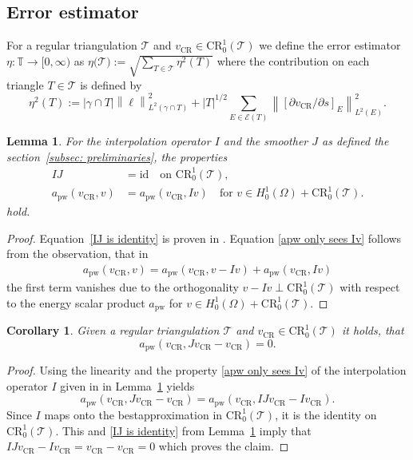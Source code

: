 \documentclass[11pt,a4paper]{article}
\newcommand{\vCR}{v_{\mathrm{CR}}}
\newcommand{\norm}[1]{\left \lVert #1 \right \rVert}
\newcommand{\apw}[2]{a_{\mathrm{pw}}\!\left(#1,#2\right)}
\newcommand{\CR}{\mathrm{CR}^1_0(\mathcal{T})}
\newtheorem{lemma}{Lemma}
\newtheorem{corollary}{Corollary}
\begin{document}
\subsection{Error estimator}
For a regular triangulation \(\mathcal{T}\) and  \(\vCR \in \CR\) we define the error estimator \(\eta: \mathbb{T} \rightarrow [0,\infty)\) as \(\eta(\mathcal{T)} := \sqrt{\sum_{T \in \mathcal{T}} \eta^2(T)}\) where the contribution on each triangle \(T \in \mathcal{T}\) is defined by
\begin{equation} \label{definition estimator}
\eta^2(T) := |\gamma \cap T| \norm{\ell}^2_{L^2(\gamma \cap T)} + |T|^{1/2} \sum_{E \in \mathcal{E}(T)} \norm{[\partial \vCR/\partial s]_E}^2_{L^2(E)}.
\end{equation}
\begin{lemma}
\label{lemma: properties of I and J}
For the interpolation operator \(I\) and the smoother \(J\) as defined the section~\ref{subsec: preliminaries}, the properties
\begin{align}
IJ &= \mathrm{id} \quad \text{on } \mathrm{CR}^1_0(\mathcal{T}), \label{IJ is identity}\\
\apw{\vCR}{v} &= \apw{\vCR}{Iv} \quad \text{for } v \in H^1_0(\Omega) + \CR. \label{apw only sees Iv}
\end{align}
hold. 
\end{lemma}
\begin{proof}
Equation~\eqref{IJ is identity} is proven in \cite[pp. 62-68]{Puttkammer2023}. Equation \eqref{apw only sees Iv} follows from the observation, that in
\begin{align*}
\apw{\vCR}{v} = \apw{\vCR}{v-Iv} + \apw{\vCR}{Iv}
\end{align*}
the first term vanishes due to the orthogonality \(v - Iv \perp \mathrm{CR}^1_0(\mathcal{T})\) with respect to the energy scalar product \(a_{\mathrm{pw}}\) for \(v \in H^1_0(\Omega) + \CR\).
\end{proof}
\begin{corollary}
\label{corollary: JvCR = vCR for apw}
Given a regular triangulation \(\mathcal{T}\) and \(\vCR \in \CR\) it holds, that
\begin{equation*}
    \apw{\vCR}{J\vCR - \vCR} = 0. 
\end{equation*}
\end{corollary}
\begin{proof}
Using the linearity and the property \eqref{apw only sees Iv} of the interpolation operator \(I\) given in in Lemma~\ref{lemma: properties of I and J} yields
\begin{equation*}
\apw{\vCR}{J\vCR-\vCR} = \apw{\vCR}{IJ\vCR - I\vCR}.
\end{equation*}
Since \(I\) maps onto the bestapproximation in \(\CR\), it is the identity on \(\CR\). This and \eqref{IJ is identity} from Lemma~\ref{lemma: properties of I and J} imply that \(IJ\vCR - I\vCR = \vCR - \vCR = 0\) which proves the claim. 
\end{proof}
\end{document}
